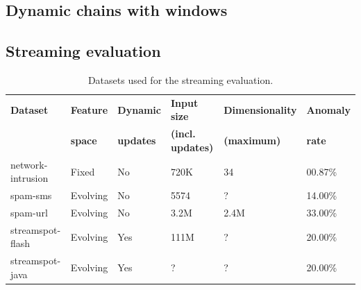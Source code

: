 \documentclass[11pt,onecolumn]{article}
\begin{document}
\pagebreak

\subsection{Dynamic chains with windows}

\pagebreak

\subsection{Streaming evaluation}

\begin{table}[ht!]
	\centering
	\begin{tabular}{llllll}
	\toprule
	\textbf{Dataset} & \textbf{Feature} & \textbf{Dynamic} & \textbf{Input size} 		  & \textbf{Dimensionality} & \textbf{Anomaly}\\
									 & \textbf{space}   & \textbf{updates} & \textbf{(incl. updates)} & \textbf{(maximum)} 			& \textbf{rate}\\
	\midrule
	network-intrusion& Fixed 	  		    & No				 & 720K    & 34   & 00.87\%\\
 	spam-sms 			 	 & Evolving 			  & No				 & 5574 	 & ? 	 & 14.00\%\\
 	spam-url 			 	 & Evolving 				& No				 & 3.2M    & 2.4M & 33.00\%\\
	streamspot-flash & Evolving 				& Yes				 & 111M    & ?    & 20.00\%\\
	streamspot-java  & Evolving 				& Yes				 & ?       & ?    & 20.00\%\\
	\bottomrule
	\end{tabular}
	\caption{Datasets used for the streaming evaluation.}
	\label{table:datasets}
\end{table}

\pagebreak





\printbibliography
\end{document}
